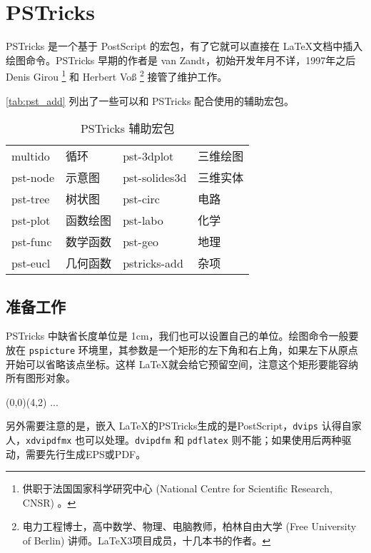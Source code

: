 \chapter{PSTricks}
\label{sec:pstricks}

PSTricks 是一个基于 PostScript 的宏包，有了它就可以直接在 \LaTeX 文档中插入绘图命令。PSTricks 早期的作者是 van Zandt\indexVanZandt ，初始开发年月不详，1997年之后 Denis Girou\indexGirou{} \footnote{供职于法国国家科学研究中心 (National Centre for Scientific Research, CNSR) 。} 和 Herbert Voß\indexVoss{} \footnote{电力工程博士，高中数学、物理、电脑教师，柏林自由大学 (Free University of Berlin) 讲师。\LaTeX{}3项目成员，十几本书的作者。} 接管了维护工作。

\autoref{tab:pst_add} 列出了一些可以和 PSTricks 配合使用的辅助宏包。

\begin{table}[htbp]
\caption{PSTricks 辅助宏包}
\label{tab:pst_add}
\centering
\begin{tabular}{llll}
  \toprule
  multido & 循环      & pst-3dplot & 三维绘图 \\
  pst-node & 示意图   & pst-solides3d & 三维实体 \\
  pst-tree & 树状图   & pst-circ & 电路 \\
  pst-plot & 函数绘图 & pst-labo & 化学 \\
  pst-func & 数学函数 & pst-geo & 地理 \\
  pst-eucl & 几何函数 & pstricks-add & 杂项 \\
  \bottomrule
\end{tabular}
\end{table}

\section{准备工作}
\label{sec:pst_setup}

PSTricks 中缺省长度单位是 1cm，我们也可以设置自己的单位。绘图命令一般要放在 \texttt{pspicture} 环境里，其参数是一个矩形的左下角和右上角，如果左下从原点开始可以省略该点坐标。这样 \LaTeX 就会给它预留空间，注意这个矩形要能容纳所有图形对象。

\begin{Code}[]
\begin{pspicture}(0,0)(4,2)
...
\end{pspicture}
\end{Code}

另外需要注意的是，嵌入 \LaTeX 的PSTricks生成的是PostScript，\texttt{dvips} 认得自家人，\texttt{xdvipdfmx} 也可以处理。\texttt{dvipdfm} 和 \texttt{pdflatex} 则不能；如果使用后两种驱动，需要先行生成EPS或PDF。

